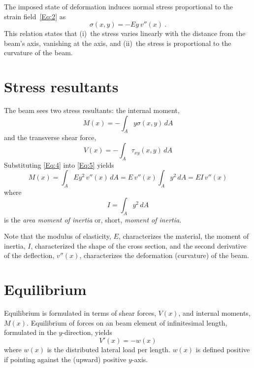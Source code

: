 \documentclass[11pt, oneside]{article}   	%
\begin{document}
The imposed state of deformation induces normal stress proportional to the strain field~\eqref{Eq:2} as
\begin{equation}
	\sigma(x,y) = -E y\,v''(x) ~.
	\label{Eq:4}
\end{equation}
This relation states that (i)~the stress varies linearly with the distance from the beam's axis, vanishing at the axis, and (ii)~the stress is proportional to the curvature of the beam.

\section{Stress resultants}
The beam sees two stress resultants: the internal moment, 
\begin{equation}
	M(x) = -\int_A y\sigma(x,y)\, dA
	\label{Eq:5}
\end{equation}
and the transverse shear force,
\begin{equation}
	V(x)  = -\int_A \tau_{xy}(x,y)\, dA
	\label{Eq:6}
\end{equation}
Substituting \eqref{Eq:4} into \eqref{Eq:5} yields
\begin{equation}
	M(x) = \int_A E y^2 \, v''(x) \, dA = E\,v''(x) \int_A y^2\,dA = EI\,v''(x)
	\label{Eq:7}
\end{equation}
where 
\begin{equation}
	I = \int_A y^2\,dA
	\label{Eq:7b}
\end{equation}
is the \emph{area moment of inertia} or, short, \emph{moment of inertia}.

Note that the modulus of elasticity, $E$, characterizes the material, the moment of inertia, $I$, characterized the shape of the cross section, and the second derivative of the deflection, $v''(x)$, characterizes the deformation (curvature) of the beam.

\section{Equilibrium}
Equilibrium is formulated in terms of shear forces, $V(x)$, and internal moments, $M(x)$.
Equilibrium of forces on an beam element of infinitesimal length, formulated in the $y$-direction, yields
\begin{equation}
	V'(x) = -w(x)
	\label{Eq:8}
\end{equation}
where $w(x)$ is the distributed lateral load per length.  $w(x)$ is defined positive if pointing against the (upward) positive $y$-axis.
\end{document}

